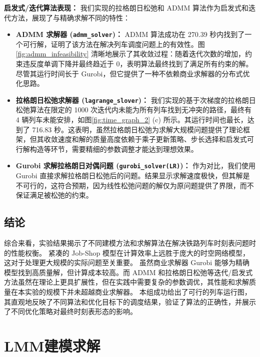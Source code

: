 \documentclass{article}
\begin{document}
    \textbf{启发式/迭代算法表现：}
    我们实现的拉格朗日松弛和 ADMM 算法作为启发式和迭代方法，展现了与精确求解不同的特性：
    \begin{itemize}
        \item \textbf{ADMM 求解器 (\texttt{admm\_solver})：} ADMM 算法成功在 270.39 秒内找到了一个可行解，证明了该方法在解决列车调度问题上的有效性。图 \ref{fig:admm_infeasibility} 清晰地展示了其收敛过程：随着迭代次数的增加，约束违反度单调下降并最终趋近于 0，表明算法最终找到了满足所有约束的解。尽管其运行时间长于 Gurobi，但它提供了一种不依赖商业求解器的分布式优化思路。
        \item \textbf{拉格朗日松弛求解器 (\texttt{lagrange\_slover})：} 我们实现的基于次梯度的拉格朗日松弛算法在限定的 1000 次迭代内未能为所有列车找到无冲突的路径，最终有 4 辆列车未能安排，如图\ref{fig:time_graph_2} (c) 所示。其运行时间也最长，达到了 716.83 秒。这表明，虽然拉格朗日松弛为求解大规模问题提供了理论框架，但其收敛速度和解的质量高度依赖于乘子更新策略、步长选择和启发式可行解构造等环节，需要精细的参数调整才能达到理想效果。
        \item \textbf{Gurobi 求解拉格朗日对偶问题 (\texttt{gurobi\_solver(LR)})：} 作为对比，我们使用 Gurobi 直接求解拉格朗日松弛后的问题。结果显示求解速度极快，但其解是不可行的，这符合预期，因为线性松弛问题的解仅为原问题提供了界限，而不保证满足被松弛的约束。
    \end{itemize}

    \subsection{结论}
    综合来看，实验结果揭示了不同建模方法和求解算法在解决铁路列车时刻表问题时的性能权衡。 紧凑的 Job-Shop 模型在计算效率上远胜于庞大的时空网络模型，这对于处理更大规模的实际问题至关重要。
    虽然商业求解器 Gurobi 能够为精确模型找到高质量解，但计算成本较高。而 ADMM 和拉格朗日松弛等迭代/启发式方法虽然在理论上更具扩展性，但在实践中需要复杂的参数调优，其性能和求解质量在本实验的规模下并未超越商业求解器。
    本组成功给出了可行的列车运行图，其直观地反映了不同算法和优化目标下的调度结果，验证了算法的正确性，并展示了不同优化策略对最终时刻表形态的影响。


    \section{LMM建模求解}
\end{document}
